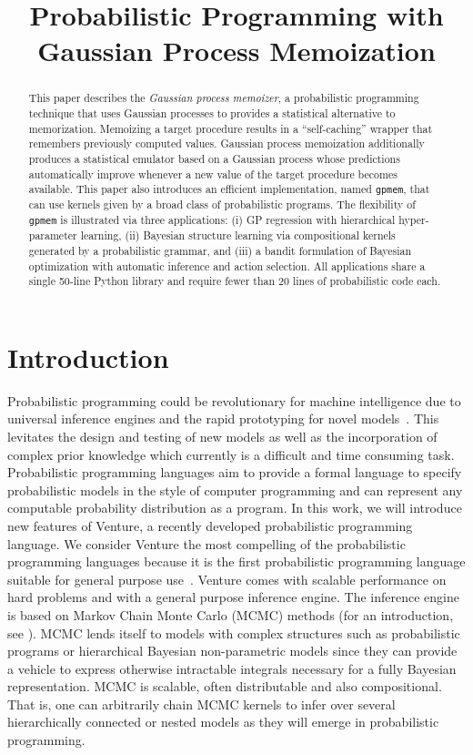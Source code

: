 \documentclass{article} %
\title{Probabilistic Programming with Gaussian Process Memoization}
\author{
}
\begin{document}
\maketitle

\begin{abstract}
This paper describes the {\em Gaussian process memoizer}, a probabilistic programming technique that uses Gaussian processes to provides a statistical alternative to memorization. Memoizing a target procedure results in a “self-caching” wrapper that remembers previously computed values. Gaussian process memoization additionally produces a statistical emulator based on a Gaussian process whose predictions automatically improve whenever a new value of the target procedure becomes available. This paper also introduces  an efficient implementation, named {\tt gpmem}, that can use kernels given by a broad class of probabilistic programs. The flexibility of {\tt gpmem} is illustrated via three applications: (i) GP regression with hierarchical hyper-parameter learning, (ii) Bayesian structure learning via compositional kernels generated by a probabilistic grammar, and (iii) a bandit formulation of Bayesian optimization with automatic inference and action selection. All applications share a single 50-line Python library and require fewer than 20 lines of probabilistic code each.
\end{abstract}
\section{Introduction}
Probabilistic programming could be revolutionary for machine intelligence due to universal inference engines and the rapid prototyping for novel models~\citep{ghahramani2015probabilistic}. This levitates the design and testing of new models as well as the incorporation of complex prior knowledge which currently is a difficult and time consuming task. Probabilistic programming languages aim to provide a formal language to specify probabilistic models in the style of computer programming and can represent any computable probability distribution as a program. In this work, we will introduce new features of Venture, a recently developed probabilistic programming language. We consider Venture the most compelling of the probabilistic programming languages because it is the first probabilistic programming language suitable for general purpose use~\citep{mansinghka2014venture}. Venture comes with scalable performance on hard problems and with a general purpose inference engine. The inference engine is based on Markov Chain Monte Carlo (MCMC) methods (for an introduction, see \citet*{andrieu2003introduction}). MCMC lends itself to models with complex structures such as probabilistic programs or hierarchical Bayesian non-parametric models since they can provide a vehicle to express otherwise intractable integrals necessary for a fully Bayesian representation. MCMC is scalable, often distributable and also compositional. That is, one can arbitrarily chain MCMC kernels to infer over several hierarchically connected or nested models as they will emerge in probabilistic programming.
\end{document}
